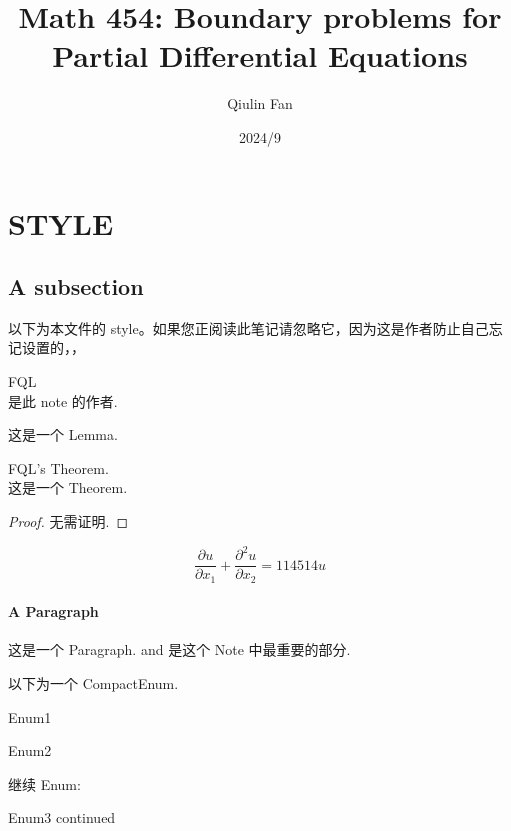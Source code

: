 \documentclass[12pt]{article}
\begin{document}
\title{Math 454: Boundary problems for Partial Differential Equations}

\author{%
   Qiulin Fan%
}

\date{2024/9}

\maketitle

\section*{STYLE}
\subsection{A subsection}
以下为本文件的 style。如果您正阅读此笔记请忽略它，因为这是作者防止自己忘记设置的，，
\begin{defn}
%
FQL
\\  是此 note 的作者.
\end{defn}
\begin{lemma}
    这是一个 Lemma.
\end{lemma}
\begin{theorem}
FQL's Theorem.
\\  这是一个 Theorem.
\end{theorem}
\begin{proof}
    无需证明.
\end{proof}
\begin{equation}
    \frac{\partial{u}}{\partial{x_1}} + \frac{\partial^2{u}}{\partial{x_2}} = 114514u
\end{equation}
\paragraph{A Paragraph}
这是一个 Paragraph.
 and  是这个 Note 中最重要的部分.

以下为一个 CompactEnum.
\begin{compactenumI}
    \item Enum1
    \item Enum2
\end{compactenumI}
继续 Enum:
\begin{compactenumI}[resume]
    \smallskip%
    \item Enum3 continued
\end{compactenumI}
\end{document}
